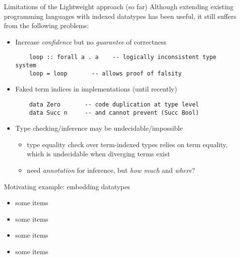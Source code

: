 \documentclass[final]{beamer}
\begin{document}
\begin{frame}[fragile]
\begin{columns}[t]
\begin{column}{.315\linewidth}
\begin{block}{Limitations of the Lightweight approach {\normalsize(so far)}}
Although extending existing programming languages with indexed datatypes
has been useful, it still suffers from the following problems:
\begin{itemize}
\item Increase \emph{confidence} but no \emph{guarantee} of correctness
	\begin{lstlisting}
	loop :: forall a . a    -- logically inconsistent type system
	loop = loop       -- allows proof of falsity
	\end{lstlisting}
\item Faked term indices in implementations (until recently)
	\begin{lstlisting}
	data Zero       -- code duplication at type level
	data Succ n     -- and cannot prevent (Succ Bool)
	\end{lstlisting}
\item Type checking/inference may be undecidable/impossible
	\begin{itemize}
		\item type equality check over term-indexed types
			relies on term equality, which is undecidable
			when diverging terms exist
		\item need \emph{annotation} for inference,
			but \emph{how much} and \emph{where}?
	\end{itemize}
\end{itemize}
\end{block}

\begin{block}{Motivating example: embedding datatypes}
\begin{itemize}
\item some items
\item some items
\item some items
\item some items
\end{itemize}
\end{block}


\end{column}
\begin{column}{.315\linewidth}


\end{column}
\end{columns}
\end{frame}
\end{document}
